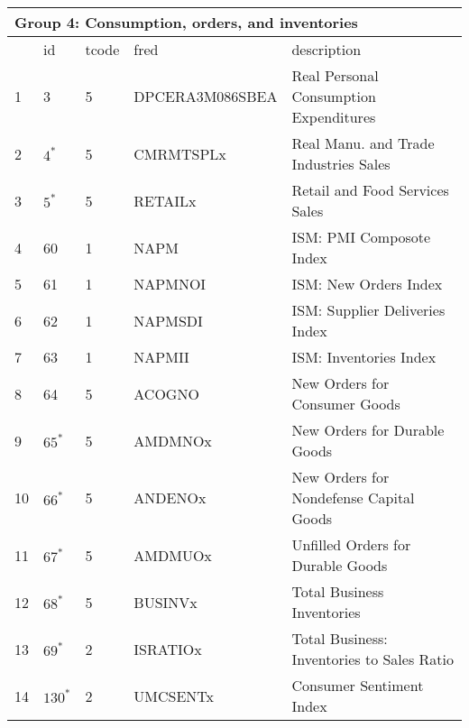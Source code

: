 \begin{table}[ht] 
\centering 
\begin{tabular}{lllll}
\multicolumn{5}{l}{Group 4: Consumption, orders, and inventories} \\
\toprule
 & id & tcode & fred & description \\
\midrule
1 & 3 & 5 & DPCERA3M086SBEA & Real Personal Consumption Expenditures \\
2 & $4^*$ & 5 & CMRMTSPLx & Real Manu. and Trade Industries Sales \\
3 & $5^*$ & 5 & RETAILx & Retail and Food Services Sales \\
\rowcolor{gray} 4 & 60 & 1 & NAPM & ISM: PMI Composote Index \\
\rowcolor{gray} 5 & 61 & 1 & NAPMNOI & ISM: New Orders Index \\
\rowcolor{gray} 6 & 62 & 1 & NAPMSDI & ISM: Supplier Deliveries Index \\
\rowcolor{gray} 7 & 63 & 1 & NAPMII & ISM: Inventories Index \\
\rowcolor{Maroon} 8 & 64 & 5 & ACOGNO & New Orders for Consumer Goods \\
9 & $65^*$ & 5 & AMDMNOx & New Orders for Durable Goods \\
\rowcolor{Maroon} 10 & $66^*$ & 5 & ANDENOx & New Orders for Nondefense Capital Goods \\
11 & $67^*$ & 5 & AMDMUOx & Unfilled Orders for Durable Goods \\
12 & $68^*$ & 5 & BUSINVx & Total Business Inventories \\
13 & $69^*$ & 2 & ISRATIOx & Total Business: Inventories to Sales Ratio \\
\rowcolor{Maroon} 14 & $130^*$ & 2 & UMCSENTx & Consumer Sentiment Index \\
\bottomrule
\end{tabular}  
\end{table} 